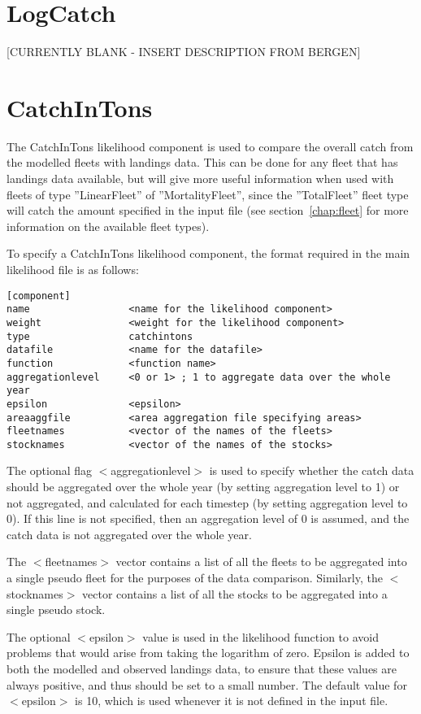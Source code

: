 \documentclass [a4paper, 10pt]{book}
\begin{document}
\section{LogCatch}\label{sec:logcatch}
[CURRENTLY BLANK - INSERT DESCRIPTION FROM BERGEN]

\section{CatchInTons}\label{sec:catchintons}
The CatchInTons likelihood component is used to compare the overall catch from the modelled fleets with landings data.  This can be done for any fleet that has landings data available, but will give more useful information when used with fleets of type ''LinearFleet'' of ''MortalityFleet'', since the ''TotalFleet'' fleet type will catch the amount specified in the input file (see section~\ref{chap:fleet} for more information on the available fleet types).

\bigskip
To specify a CatchInTons likelihood component, the format required in the main likelihood file is as follows:

{\small\begin{verbatim}
[component]
name                 <name for the likelihood component>
weight               <weight for the likelihood component>
type                 catchintons
datafile             <name for the datafile>
function             <function name>
aggregationlevel     <0 or 1> ; 1 to aggregate data over the whole year
epsilon              <epsilon>
areaaggfile          <area aggregation file specifying areas>
fleetnames           <vector of the names of the fleets>
stocknames           <vector of the names of the stocks>
\end{verbatim}}

The optional flag $<$aggregationlevel$>$ is used to specify whether the catch data should be aggregated over the whole year (by setting aggregation level to 1) or not aggregated, and calculated for each timestep (by setting aggregation level to 0).  If this line is not specified, then an aggregation level of 0 is assumed, and the catch data is not aggregated over the whole year.

\bigskip
The $<$fleetnames$>$ vector contains a list of all the fleets to be aggregated into a single pseudo fleet for the purposes of the data comparison.  Similarly, the $<$stocknames$>$ vector contains a list of all the stocks to be aggregated into a single pseudo stock.

\bigskip
The optional $<$epsilon$>$ value is used in the likelihood function to avoid problems that would arise from taking the logarithm of zero.  Epsilon is added to both the modelled and observed landings data, to ensure that these values are always positive, and thus should be set to a small number.  The default value for $<$epsilon$>$ is 10, which is used whenever it is not defined in the input file.
\end{document}

